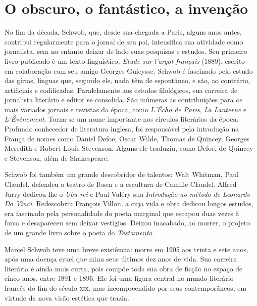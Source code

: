 \section{O obscuro, o fantástico, a invenção}

No fim da década, Schwob, que, desde sua chegada a Paris, alguns anos antes,
contribui regularmente para o jornal de seu pai, intensifica sua atividade como
jornalista, sem no entanto deixar de lado suas pesquisas e estudos. Seu
primeiro livro publicado é um texto linguístico, \textit{Étude sur l’argot
français} (1889), escrito em colaboração com seu amigo Georges Guieysse. Schwob
é fascinado pelo estudo das gírias, línguas que, segundo ele, nada têm de
espontâneo, e são, ao contrário, artificiais e codificadas. Paralelamente aos
estudos filológicos, sua carreira de jornalista literário e editor se
consolida. São inúmeras as contribuições para os mais variados jornais e
revistas da época, como \textit{L’Écho de Paris}, \textit{La Lanterne} e
\textit{L’Événement}. Torna-se um nome importante nos círculos literários da
época. Profundo conhecedor de literatura inglesa, foi responsável pela
introdução na França de nomes como Daniel Defoe, Oscar Wilde, Thomas de
Quincey, Georges Meredith e Robert-Louis Stevenson. Alguns ele traduziu, como
Defoe, de Quincey e Stevenson, além de Shakespeare.

Schwob foi também um grande descobridor de talentos: Walt Whitman, Paul
Claudel, defendeu o teatro de Ibsen e a escultura de Camille Claudel. Alfred
Jarry dedicou-lhe o \textit{Ubu rei} e Paul Valéry sua \textit{Introdução ao
método de Leonardo Da Vinci}. Redescobriu François Villon, a cuja vida e obra
dedicou longos estudos, era fascinado pela personalidade do poeta marginal que
escapou duas vezes à forca e desapareceu sem deixar vestígios. Deixou
inacabado, ao morrer, o projeto de um grande livro sobre o poeta do
\textit{Testamento}.

Marcel Schwob teve uma breve existência: morre em 1905 aos trinta e sete
anos, após uma doença cruel que mina seus últimos dez anos de vida. Sua
carreira literária é ainda mais curta, pois compõe toda sua obra de ficção no
espaço de cinco anos, entre 1891 e 1896. Ele foi uma figura central no mundo
literário francês do fim do século \textsc{xix}, mas incompreendido por seus
contemporâneos, em virtude da nova visão estética que trazia.

